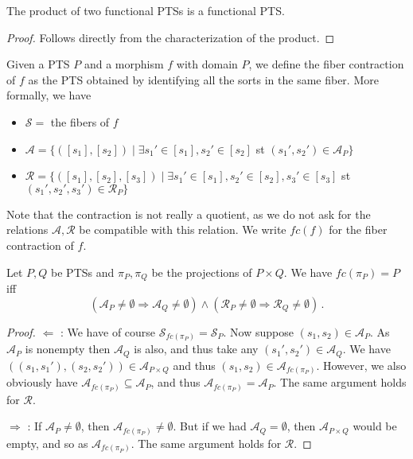 \documentclass[]{template}
\begin{document}
\begin{cor}[]
The product of two functional PTSs is a functional PTS.
\end{cor}
\begin{proof}
Follows directly from the characterization of the product.
\end{proof}


\begin{definition}[]
  Given a PTS $ P $ and a morphism $ f $ with domain $ P $, we define the fiber contraction of $ f$ as the PTS obtained by identifying all the sorts in the same fiber. More formally, we have
  \begin{itemize}
  \item $ \mathcal{S} = $ the fibers of $ f $
  \item $ \mathcal{A} =  \{ ([s_1], [s_2]) \mid \exists s_1' \in [s_1], s_2' \in [s_2] $ st $ (s_1', s_2') \in \mathcal{A}_P \}$
  \item $ \mathcal{R} =  \{ ([s_1], [s_2], [s_3]) \mid \exists s_1' \in [s_1], s_2' \in [s_2], s_3' \in [s_3] $ st $ (s_1', s_2', s_3') \in \mathcal{R}_P \}$    
  \end{itemize}
\end{definition}

Note that the contraction is not really a quotient, as we do not ask for the relations $ \mathcal{A}, \mathcal{R} $ be compatible with this relation. We write $ fc(f) $ for the fiber contraction of $ f $. 

\begin{lem}[]
Let $ P, Q $ be PTSs and $ \pi_P, \pi_Q $ be the projections of $ P \times Q $. We have $ fc(\pi_P) = P $ iff \[
  (\mathcal{A}_P \neq \emptyset \Rightarrow \mathcal{A}_Q \neq \emptyset) \land   (\mathcal{R}_P \neq \emptyset \Rightarrow \mathcal{R}_Q \neq \emptyset) 
  \,.\]
\end{lem}
\begin{proof}
  $\Leftarrow$ : We have of course $ \mathcal{S}_{fc(\pi_P)} = \mathcal{S}_P $. Now suppose $ (s_1, s_2) \in \mathcal{A}_P $. As $ \mathcal{A}_P $ is nonempty then $ \mathcal{A}_Q$ is also, and thus take any $(s_1', s_2') \in \mathcal{A}_Q $. We have $ ((s_1,s_1'),(s_2,s_2')) \in \mathcal{A}_{P \times Q} $ and thus $ (s_1, s_2) \in \mathcal{A}_{fc(\pi_P)} $. However, we also obviously have $ \mathcal{A}_{fc(\pi_P)} \subseteq \mathcal{A}_P $, and thus $ \mathcal{A}_{fc(\pi_P)} = \mathcal{A}_P $. The same argument holds for $ \mathcal{R} $.

  $ \Rightarrow $ : If $ \mathcal{A}_P \neq \emptyset $, then $ \mathcal{A}_{fc(\pi_P)} \neq \emptyset $. But if we had $\mathcal{A}_Q = \emptyset$, then $ \mathcal{A}_{P \times Q} $ would be empty, and so as $ \mathcal{A}_{fc(\pi_P)}$. The same argument holds for $ \mathcal{R} $.
\end{proof}
\end{document}
